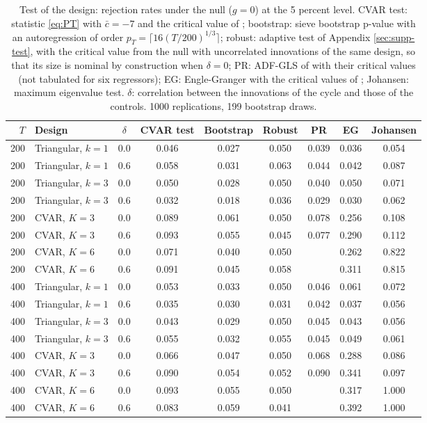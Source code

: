 \begin{table}[H]
\centering\small
\caption{Test of the design: rejection rates under the null ($g=0$) at the 5 percent level. CVAR test: statistic \eqref{eq:PT} with $\bar c=-7$ and the critical value of \citet{ERS1996}; bootstrap: sieve bootstrap p-value with an autoregression of order $p_T=\lceil16(T/200)^{1/3}\rceil$; robust: adaptive test of Appendix \ref{sec:supp-test}, with the critical value from the null with uncorrelated innovations of the same design, so that its size is nominal by construction when $\delta=0$; PR: ADF-GLS of \citet{PerronRodriguez2016} with their critical values (not tabulated for six regressors); EG: Engle-Granger with the critical values of \citet{MacKinnon2010}; Johansen: maximum eigenvalue test. $\delta$: correlation between the innovations of the cycle and those of the controls. 1000 replications, 199 bootstrap draws.\label{tab:mc-test-size}}
\begin{tabular}{rlc cccccc}
\toprule
$T$ & Design & $\delta$ & CVAR test & Bootstrap & Robust & PR & EG & Johansen\\
\midrule
200 & Triangular, $k=1$ & 0.0 & 0.046 & 0.027 & 0.050 & 0.039 & 0.036 & 0.054\\
200 & Triangular, $k=1$ & 0.6 & 0.058 & 0.031 & 0.063 & 0.044 & 0.042 & 0.087\\
200 & Triangular, $k=3$ & 0.0 & 0.050 & 0.028 & 0.050 & 0.040 & 0.050 & 0.071\\
200 & Triangular, $k=3$ & 0.6 & 0.032 & 0.018 & 0.036 & 0.029 & 0.030 & 0.062\\
200 & CVAR, $K=3$ & 0.0 & 0.089 & 0.061 & 0.050 & 0.078 & 0.256 & 0.108\\
200 & CVAR, $K=3$ & 0.6 & 0.093 & 0.055 & 0.045 & 0.077 & 0.290 & 0.112\\
200 & CVAR, $K=6$ & 0.0 & 0.071 & 0.040 & 0.050 &  & 0.262 & 0.822\\
200 & CVAR, $K=6$ & 0.6 & 0.091 & 0.045 & 0.058 &  & 0.311 & 0.815\\
400 & Triangular, $k=1$ & 0.0 & 0.053 & 0.033 & 0.050 & 0.046 & 0.061 & 0.072\\
400 & Triangular, $k=1$ & 0.6 & 0.035 & 0.030 & 0.031 & 0.042 & 0.037 & 0.056\\
400 & Triangular, $k=3$ & 0.0 & 0.043 & 0.029 & 0.050 & 0.045 & 0.043 & 0.056\\
400 & Triangular, $k=3$ & 0.6 & 0.055 & 0.032 & 0.055 & 0.045 & 0.049 & 0.061\\
400 & CVAR, $K=3$ & 0.0 & 0.066 & 0.047 & 0.050 & 0.068 & 0.288 & 0.086\\
400 & CVAR, $K=3$ & 0.6 & 0.090 & 0.054 & 0.052 & 0.090 & 0.341 & 0.097\\
400 & CVAR, $K=6$ & 0.0 & 0.093 & 0.055 & 0.050 &  & 0.317 & 1.000\\
400 & CVAR, $K=6$ & 0.6 & 0.083 & 0.059 & 0.041 &  & 0.392 & 1.000\\
\bottomrule
\end{tabular}
\end{table}
